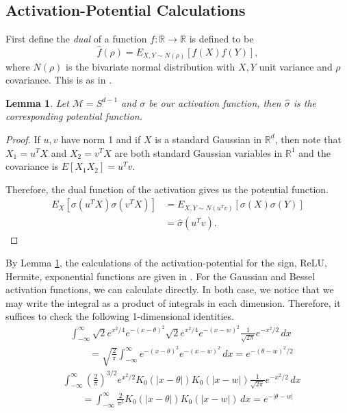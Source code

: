 \documentclass{article}
\newtheorem{lemma}[theorem]{Lemma}
\newcommand{\R}{{\mathbb{R}}}
\begin{document}
\subsection{Activation-Potential Calculations}
First define the {\it dual} of a function $f: \R \to \R$ is defined to be 
%
\[ \widehat{f}(\rho) = E_{X,Y \sim N(\rho)}[f(X)f(Y)],\]
%
where $N(\rho)$ is the bivariate normal distribution with $X, Y$ unit variance and $\rho$ covariance. This is as in \cite{DanielyFS16}.
%
\begin{lemma}\label{rotLem}
Let $\mathcal{M} = S^{d-1}$ and $\sigma$ be our activation function, then $\widehat{\sigma}$ is the corresponding potential function.
\end{lemma}

\begin{proof}
If $u, v$ have norm 1 and if $X$ is a standard Gaussian in $\R^d$, then note that $X_1 = u^TX$ and $X_2 = v^TX$ are both standard Gaussian variables in $\R^1$ and the covariance is $E[X_1X_2] = u^Tv$. 

Therefore, the dual function of the activation gives us the potential function.
\begin{align*}
E_{X}[\sigma(u^TX)\sigma(v^TX)] & =
E_{X,Y \sim N(u^Tv)}[\sigma(X)\sigma(Y)] \\
& = \widehat{\sigma}(u^Tv).
\end{align*}
\end{proof}

By Lemma \ref{rotLem}, the calculations of the activation-potential
for the sign, ReLU, Hermite, exponential functions are given in
\cite{DanielyFS16}. For the Gaussian and Bessel activation functions,
we can calculate directly. In both case, we notice that we may write
the integral as a product of integrals in each dimension. Therefore,
it suffices to check the following 1-dimensional identities.
\begin{align*}
  & \int_{-\infty}^\infty
    \sqrt{2}e^{x^2/4}e^{-(x-\theta)^2}\sqrt{2}e^{x^2/4}e^{-(x-w)^2} \frac{1}{\sqrt{2\pi}} e^{-x^2/2}\, dx \\
  & \qquad = \sqrt{\frac{2}{\pi}}\int_{-\infty}^\infty
    e^{-(x-\theta)^2}e^{-(x-w)^2} \, dx = e^{-(\theta -w)^2/2}
\end{align*}
\begin{align*}
& \int_{-\infty}^\infty (\frac{2}{\pi})^{3/2}e^{x^2/2}K_0(|x-\theta|)K_0(|x-w|)  \frac{1}{\sqrt{2\pi}} e^{-x^2/2}\, dx \\
& \qquad 
= \int_{-\infty}^\infty \frac{2}{\pi^2}K_0(|x-\theta|)K_0(|x-w|) \, dx
  = e^{-|\theta -w|}
\end{align*}
\end{document}
